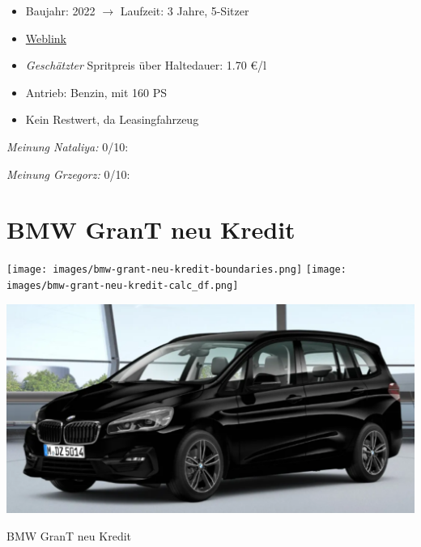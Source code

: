 \documentclass[landscape, DIV=99, 14pt]{scrartcl}
\begin{document}
\begin{itemize}
    \item Baujahr: 2022 $\rightarrow$ Laufzeit: 3 Jahre, 5-Sitzer
    \item \href{https://konfigurator.meinauto.de/kia/neuwagen/cee-d/angebote/cee-d-sporty-wagon/konfigurator/\#!/extras/spirit/8865371/3,11,27/private/109347-4167-291321/1321/61d21ce73c5db/leasing/109348-8088-291322/36,3000,15000,0,0,0,0,0,}{Weblink}
    \item \emph{Gesch\"atzter} Spritpreis \"uber Haltedauer: 1.70 \euro{}/l
    \item Antrieb: Benzin, mit 160 PS
    \item Kein Restwert, da Leasingfahrzeug
\end{itemize}

\begin{small}
\emph{Meinung Nataliya:} 0/10: 
        
\emph{Meinung Grzegorz:} 0/10: 
\end{small}

\pagebreak


\twocolumn

\section*{BMW GranT neu Kredit}
\begin{center}
\texttt{[image: images/bmw-grant-neu-kredit-boundaries.png]}
\null
\vspace{0.5cm}
\texttt{[image: images/bmw-grant-neu-kredit-calc\_df.png]}
\end{center}

\pagebreak
\begin{center}
\includegraphics[width=0.9\columnwidth]{cars/bmw-gran-tourer-mulfinger.png}

BMW GranT neu Kredit
\end{center}
\end{document}
